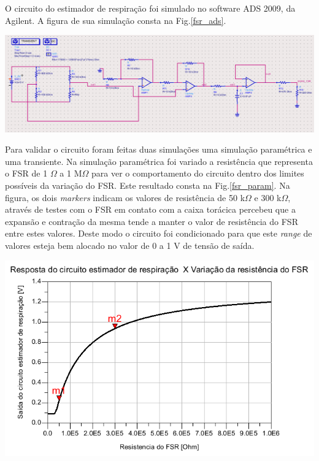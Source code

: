     O circuito do estimador de respiração foi simulado no software ADS 2009, da Agilent. A figura de sua simulação consta na Fig.\ref{fsr_ads}.  
    
    
    \begin{center}
    	\includegraphics[scale=0.42]{figuras/fsr_ads.png}
        \label{fsr_ads}
    \end{center}
    
 	Para validar o circuito foram feitas duas simulações uma simulação paramétrica e uma transiente. Na simulação paramétrica foi variado a resistência que representa o FSR de 1 $\Omega$ a 1 M$\Omega$ para ver o comportamento do circuito dentro dos limites possíveis da variação do FSR. Este resultado consta na Fig.\ref{fsr_param}. Na figura, os dois \textit{markers} indicam os valores de resistência de 50 k$\Omega$ e 300 k$\Omega$, através de testes com o FSR em contato com a caixa torácica percebeu que a expansão e contração da mesma tende a manter o valor de resistência do FSR entre estes valores. Deste modo o circuito foi condicionado para que este \textit{range} de valores esteja bem alocado no valor de 0 a 1 V de tensão de saída.
    
    
        \begin{center}
    	\includegraphics[scale=0.5]{figuras/SaidaFSR_X_resFSR.png}
        \label{fsr_param}
    \end{center}
    
